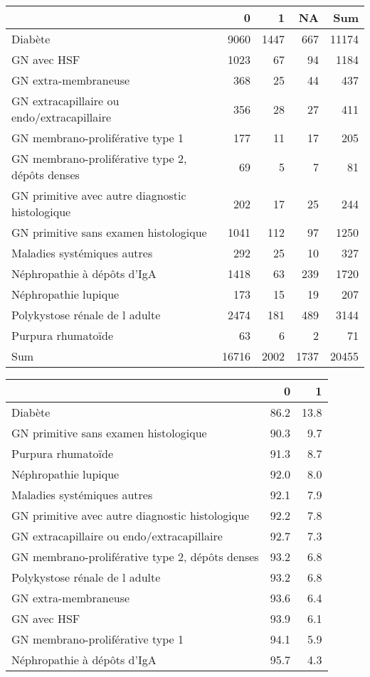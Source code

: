 \documentclass[11pt,a4paper]{article}\usepackage[]{graphicx}\usepackage[]{color}
\begin{document}
\begin{table}[H]
\centering
\begin{tabular}{lrrrr}
  \hline
 & 0 & 1 & NA & Sum \\ 
  \hline
Diabète & 9060 & 1447 & 667 & 11174 \\ 
  GN avec HSF & 1023 & 67 & 94 & 1184 \\ 
  GN extra-membraneuse & 368 & 25 & 44 & 437 \\ 
  GN extracapillaire ou endo/extracapillaire & 356 & 28 & 27 & 411 \\ 
  GN membrano-proliférative type 1 & 177 & 11 & 17 & 205 \\ 
  GN membrano-proliférative type 2, dépôts denses & 69 & 5 & 7 & 81 \\ 
  GN primitive avec autre diagnostic histologique & 202 & 17 & 25 & 244 \\ 
  GN primitive sans examen histologique & 1041 & 112 & 97 & 1250 \\ 
  Maladies systémiques autres & 292 & 25 & 10 & 327 \\ 
  Néphropathie à dépôts d'IgA & 1418 & 63 & 239 & 1720 \\ 
  Néphropathie lupique & 173 & 15 & 19 & 207 \\ 
  Polykystose rénale de l adulte & 2474 & 181 & 489 & 3144 \\ 
  Purpura rhumatoïde & 63 & 6 & 2 & 71 \\ 
  Sum & 16716 & 2002 & 1737 & 20455 \\ 
   \hline
\end{tabular}
\end{table}
\begin{table}[H]
\centering
\begin{tabular}{lrr}
  \hline
 & 0 & 1 \\ 
  \hline
Diabète & 86.2 & 13.8 \\ 
  GN primitive sans examen histologique & 90.3 & 9.7 \\ 
  Purpura rhumatoïde & 91.3 & 8.7 \\ 
  Néphropathie lupique & 92.0 & 8.0 \\ 
  Maladies systémiques autres & 92.1 & 7.9 \\ 
  GN primitive avec autre diagnostic histologique & 92.2 & 7.8 \\ 
  GN extracapillaire ou endo/extracapillaire & 92.7 & 7.3 \\ 
  GN membrano-proliférative type 2, dépôts denses & 93.2 & 6.8 \\ 
  Polykystose rénale de l adulte & 93.2 & 6.8 \\ 
  GN extra-membraneuse & 93.6 & 6.4 \\ 
  GN avec HSF & 93.9 & 6.1 \\ 
  GN membrano-proliférative type 1 & 94.1 & 5.9 \\ 
  Néphropathie à dépôts d'IgA & 95.7 & 4.3 \\ 
   \hline
\end{tabular}
\end{table}
\end{document}
